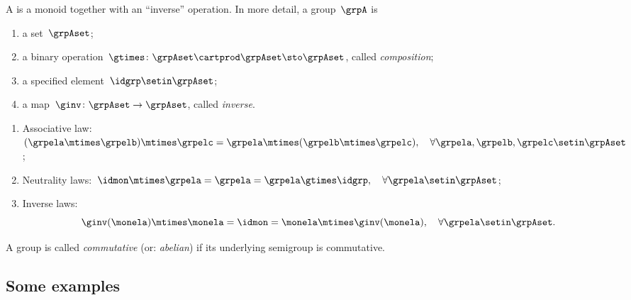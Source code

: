 \begin{ctdefinition}[Group]
    \label{def:group}
    A \emph{} is a monoid together with an ``inverse'' operation.
    In more detail, a group~$\grpA$ is
    \begin{body}
        \constit
        \begin{enumerate}
            \item a set~$\grpAset$;
            \item a binary operation~$\gtimes \colon \grpAset \cartprod \grpAset \sto \grpAset$, called \emph{composition};
            \item a specified element~$\idgrp \setin \grpAset$;
            \item a map~$\ginv\colon \grpAset \to \grpAset$, called \emph{inverse}.
        \end{enumerate}
        \condit
        \begin{enumerate}
            \item Associative law:~$(\grpela\mtimes \grpelb)\mtimes \grpelc=\grpela\mtimes (\grpelb\mtimes \grpelc), \quad \forall  \grpela, \grpelb, \grpelc \setin \grpAset$;
            \item Neutrality laws:~$\idmon\mtimes \grpela=\grpela=\grpela \gtimes \idgrp, \quad \forall  \grpela \setin \grpAset$;
            \item Inverse laws:
                  \begin{equation}
                      \label{eq:group-inverse-law}
                      \ginv(\monela) \mtimes \monela = \idmon = \monela \mtimes \ginv(\monela), \quad \forall  \grpela  \setin \grpAset.
                  \end{equation}
        \end{enumerate}
    \end{body}
\end{ctdefinition}

\begin{remark}
A group is called \emph{commutative} (or: \emph{abelian}) if its underlying semigroup is commutative.
\end{remark}

\subsection{Some examples}

